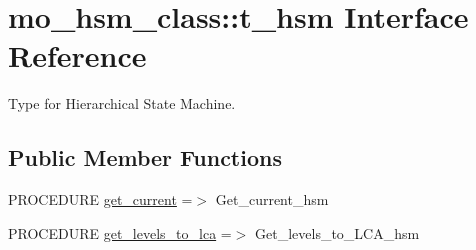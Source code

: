 \hypertarget{structmo__hsm__class_1_1t__hsm}{}\section{mo\+\_\+hsm\+\_\+class\+:\+:t\+\_\+hsm Interface Reference}
\label{structmo__hsm__class_1_1t__hsm}


Type for Hierarchical State Machine.  


\subsection*{Public Member Functions}
\begin{DoxyCompactItemize}
\item 
P\+R\+O\+C\+E\+D\+U\+R\+E \hyperlink{structmo__hsm__class_1_1t__hsm_ab2d1ff5acb909badd755032905b7f76b}{get\+\_\+current} =$>$ Get\+\_\+current\+\_\+hsm
\item 
P\+R\+O\+C\+E\+D\+U\+R\+E \hyperlink{structmo__hsm__class_1_1t__hsm_a80b6dcd63695591ff5a1c77ca3749fcc}{get\+\_\+levels\+\_\+to\+\_\+lca} =$>$ Get\+\_\+levels\+\_\+to\+\_\+\+L\+C\+A\+\_\+hsm
\end{DoxyCompactItemize}

